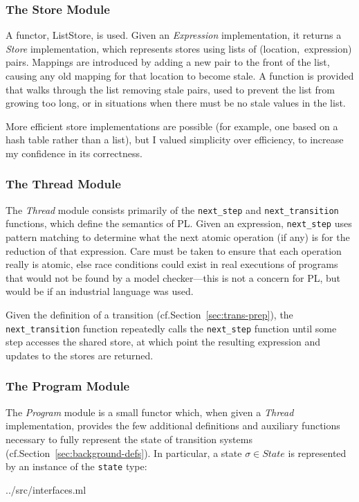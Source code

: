 \documentclass[12pt,a4paper,twoside,openright]{report}
\begin{document}
\subsubsection{The Store Module}
A functor, ListStore, is used. Given an
\emph{Expression} implementation, it
returns a \emph{Store} implementation, which
represents stores using lists of
(location,~expression) pairs. Mappings
are introduced by adding a new pair to
the front of the list, causing any old
mapping for that location to become stale.
A function is provided that walks through
the list removing stale pairs, used to
prevent the list from growing too long,
or in situations when there must be
no stale values in the list.

More efficient store implementations are
possible (for example, one based on
a hash table rather than a list), but
I valued simplicity over efficiency,
to increase my confidence in its correctness.

\subsubsection{The Thread Module}
The \emph{Thread} module consists primarily of
the \texttt{next\_step} and \texttt{next\_transition}
functions, which define the semantics of PL.
Given an expression, \texttt{next\_step} uses pattern
matching to determine what the next atomic
operation (if any) is for the reduction
of that expression.
Care must be taken to
ensure that each operation really is
atomic, else race conditions could exist
in real executions of programs that would
not be found by a model checker---this
is not a concern for PL, but would be if
an industrial language was used.

Given the definition
of a transition (cf.\@ Section~\ref{sec:trans-prep}),
the \texttt{next\_transition}
function repeatedly calls the \texttt{next\_step}
function until some step accesses the shared
store, at which point the resulting expression
and updates to the stores are returned.

\subsubsection{The Program Module}
The \emph{Program} module is a small functor which,
when given a \emph{Thread} implementation, provides 
the few additional definitions and auxiliary
functions necessary to fully represent the state of
transition systems (cf.\@ Section~\ref{sec:background-defs}).
In particular, a state $\sigma \in \textit{State}$ is
represented by an instance of the \texttt{state} type:

	{../src/interfaces.ml}
\end{document}
